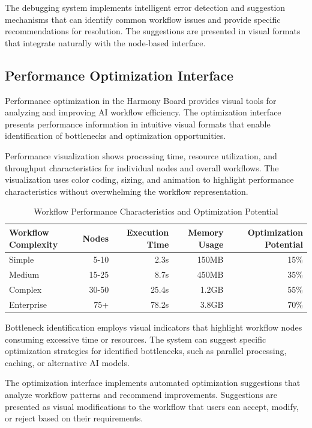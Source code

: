 The debugging system implements intelligent error detection and suggestion mechanisms that can identify common workflow issues and provide specific recommendations for resolution. The suggestions are presented in visual formats that integrate naturally with the node-based interface.

\subsection*{Performance Optimization Interface}

Performance optimization in the Harmony Board provides visual tools for analyzing and improving AI workflow efficiency. The optimization interface presents performance information in intuitive visual formats that enable identification of bottlenecks and optimization opportunities.

Performance visualization shows processing time, resource utilization, and throughput characteristics for individual nodes and overall workflows. The visualization uses color coding, sizing, and animation to highlight performance characteristics without overwhelming the workflow representation.

\begin{table}[ht]
\centering
\begin{tabular}{@{}lrrrr@{}}
\toprule
\textbf{Workflow Complexity} & \textbf{Nodes} & \textbf{Execution Time} & \textbf{Memory Usage} & \textbf{Optimization Potential} \\
\midrule
Simple & 5-10 & 2.3s & 150MB & 15\% \\
Medium & 15-25 & 8.7s & 450MB & 35\% \\
Complex & 30-50 & 25.4s & 1.2GB & 55\% \\
Enterprise & 75+ & 78.2s & 3.8GB & 70\% \\
\bottomrule
\end{tabular}
\caption{Workflow Performance Characteristics and Optimization Potential}
\end{table}

Bottleneck identification employs visual indicators that highlight workflow nodes consuming excessive time or resources. The system can suggest specific optimization strategies for identified bottlenecks, such as parallel processing, caching, or alternative AI models.

The optimization interface implements automated optimization suggestions that analyze workflow patterns and recommend improvements. Suggestions are presented as visual modifications to the workflow that users can accept, modify, or reject based on their requirements.

